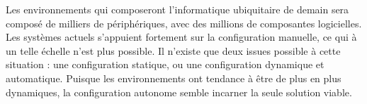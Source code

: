 Les environnements qui composeront l'informatique ubiquitaire de demain sera
composé de milliers de périphériques, avec des millions de composantes
logicielles. Les systèmes actuels s'appuient fortement sur la configuration
manuelle, ce qui à un telle échelle n'est plus possible. Il n'existe que deux
issues possible à cette situation : une configuration statique, ou une
configuration dynamique et automatique. Puisque les environnements ont
tendance à être de plus en plus dynamiques, la configuration autonome semble
incarner la seule solution viable.

